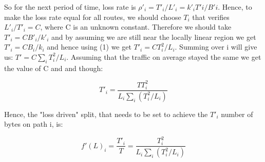 So for the next period of time, loss rate is $\rho'_{i} = T'_{i}/L'_{i} = k'_{i}T'{i}/B'{i}$. Hence, to make the loss rate equal for all routes, we should choose $T_{i}$ that verifies $L'_{i}/T'_{i}=C$, where C is an unknown constant. Therefore we should take  $T'_{i}= CB'_{i}/k'_{i}$ and by assuming we are still near the locally linear region we get  $T'_{i}= CB_{i}/k_{i}$ and hence using (1) we get  $T'_{i}= CT_{i}^{2}/L_{i}$. Summing over i will give us: $T' = C \sum_{i} T_{i}^2/L_{i}$. Assuming that the traffic on average stayed the same we get the value of C and and though: 

\begin{equation}
T'_{i} = \frac {TT_{i}^{2}} {L_{i} \sum_{i} (T_{i}^2/L_{i})}
\end{equation}

Hence, the "loss driven" split, that needs to be set to achieve the $T'_{i}$ number of bytes on path i, is:

\begin{equation}
f'(L)_{i} = \frac{T'_{i}}{T} =  \frac {T_{i}^{2}} {L_{i} \sum_{i} (T_{i}^2/L_{i})}
\end{equation}